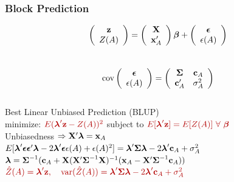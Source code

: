\documentclass[mathserif,compress]{beamer}\usepackage{graphicx, color}
\def\bc{\mathbf{c}}
\def\bx{\mathbf{x}}
\def\bz{\mathbf{z}}
\def\bX{\mathbf{X}}
\def\bbeta{\mbox{\boldmath $\beta$}}
\def\bepsilon{\mbox{\boldmath $\epsilon$}}
\def\blambda{\mbox{\boldmath $\lambda$}}
\def\bSigma{\mbox{\boldmath $\Sigma$}}
\def\var{\textrm{var}}
\def\cov{\textrm{cov}}
\def\upp{^\prime}
\def\upi{^{-1}}
\newcommand{\cre}[1]{\color{red!70!black}#1}
\begin{document}
\begin{frame}[fragile]
\frametitle{Block Prediction}
	\vspace{-.5cm}
	\[
		\left(\begin{array}{c}
		\bz \\ Z(A)
		\end{array}\right)	=
		\left(\begin{array}{c}
		\bX \\ \bx_A\upp
		\end{array}\right)\bbeta +
		\left(\begin{array}{c}
		\bepsilon \\ \epsilon(A)
		\end{array}\right)
	\] \\
	\[ 
		\cov\left(\begin{array}{c}
		\bepsilon \\ \epsilon(A)
		\end{array}\right) = 
		\left(\begin{array}{cc}
		\bSigma & \bc_A \\ \bc_A\upp & \sigma_A^2
		\end{array}\right)
	\] \\
	Best Linear Unbiased Prediction (BLUP) \\
	minimize: $\cre{E(\blambda\upp\bz - Z(A))^2}$ subject to 	$\cre{E[\blambda\upp\bz] = E[Z(A)] \ \forall \ \bbeta}$ \\
	Unbiasedness $\Rightarrow \bX\upp\blambda = \bx_A $ \\		
	$E[\blambda\upp\bepsilon\bepsilon\upp\blambda - 2\blambda\upp\bepsilon \epsilon(A) + \epsilon(A)^2] = \blambda\upp\bSigma\blambda - 2\blambda\upp\bc_A + \sigma_A^2$ \\
	$\blambda = \bSigma\upi(\bc_A + \bX(\bX\upp\bSigma\upi\bX)\upi(\bx_A - \bX\upp\bSigma\upi\bc_A))$ \\

	$ \cre{\hat{Z}(A) = \blambda\upp\bz}, \quad \cre{\var(\hat{Z}(A)) = \blambda\upp\bSigma\blambda - 2\blambda\upp\bc_A + \sigma_A^2}$

\end{frame}

\end{document}
